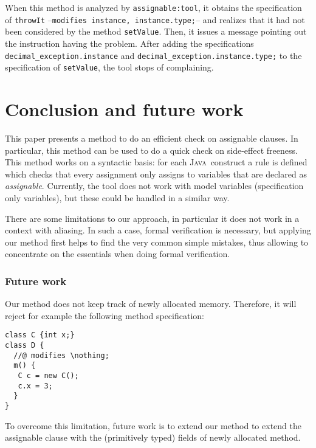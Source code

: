 \documentclass[a4paper]{llncs}
\newcommand{\java}{\textsc{Java}}
\newcommand{\modtool}{\texttt{assignable:tool}}
\newcommand{\nothing}{\texttt{\(\backslash\)nothing}}
\begin{document}
When this method is analyzed by \modtool, it obtains the specification 
of \texttt{throwIt} --\texttt{modifies instance, instance.type;}-- and 
realizes that it had not been considered by the method
\texttt{setValue}. Then, it issues a message pointing out the instruction
having the problem. After adding the specifications
\texttt{decimal\_exception.instance} and
\texttt{decimal\_exception.instance.type;} to the specification of
\texttt{setValue}, the tool stops of complaining.  


    


\section{Conclusion and future work}
\label{sec-con-and-fut-wor}
This paper presents a method to do an efficient check on assignable
clauses. In particular, this method can be used to do a quick check on 
side-effect freeness.
This method works on a syntactic basis: 
for each \java\ construct a rule is defined which checks that every
assignment only assigns to variables that are declared as 
\emph{assignable}. 
Currently, the tool
does not work with model variables (specification only variables), but
these could be handled in a similar way.

There are some limitations to our approach, in
particular it does not work in a context with aliasing. In such a
case, formal verification is necessary, but applying our method first
helps to find the very common simple mistakes, thus allowing to
concentrate on the essentials when doing formal verification.


\subsubsection{Future work}
Our method does not keep track of newly allocated memory. Therefore,
it will reject for example the following method specification:
\begin{verbatim}
class C {int x;}
class D {
  //@ modifies \nothing;
  m() {
   C c = new C();
   c.x = 3;
  }
}
\end{verbatim}
To overcome this limitation, future work is to extend our method to extend the
assignable clause with the (primitively typed) fields of newly
allocated method.
\end{document}
